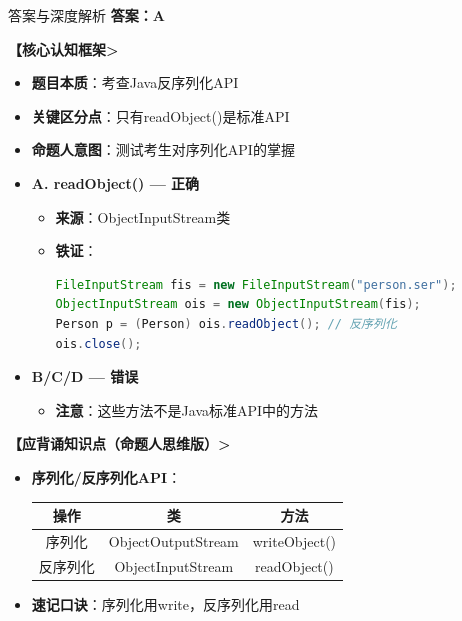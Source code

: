 \documentclass[12pt, a4paper]{ctexart}
\begin{document}
\begin{bluebox}{答案与深度解析}
	\textbf{答案：A}

	\textbf{【核心认知框架>}
	\begin{itemize}[label={}, leftmargin=*, nosep]
		\item \textbf{题目本质}：考查Java反序列化API
		\item \textbf{关键区分点}：只有readObject()是标准API
		\item \textbf{命题人意图}：测试考生对序列化API的掌握
	\end{itemize}

	\begin{itemize}[label={}, nosep]
		\item \textbf{A. readObject() — 正确}
		\begin{itemize}[label={}, leftmargin=*, nosep]
			\item \textbf{来源}：ObjectInputStream类
			\item \textbf{铁证}：
			      \begin{lstlisting}[language=Java]
FileInputStream fis = new FileInputStream("person.ser");
ObjectInputStream ois = new ObjectInputStream(fis);
Person p = (Person) ois.readObject(); // 反序列化
ois.close();
      \end{lstlisting}
		\end{itemize}

		\item \textbf{B/C/D — 错误}
		\begin{itemize}[label={}, leftmargin=*, nosep]
			\item \textbf{注意}：这些方法不是Java标准API中的方法
		\end{itemize}
	\end{itemize}

	\textbf{【应背诵知识点（命题人思维版）>}
	\begin{itemize}[label={}, nosep]
		\item \textbf{序列化/反序列化API}：
		      \begin{center}
			      \begin{tabular}{|c|c|c|}
				      \hline
				      \textbf{操作} & \textbf{类}         & \textbf{方法}   \\
				      \hline
				      序列化         & ObjectOutputStream & writeObject() \\
				      \hline
				      反序列化        & ObjectInputStream  & readObject()  \\
				      \hline
			      \end{tabular}
		      \end{center}

		\item \textbf{速记口诀}：序列化用write，反序列化用read
	\end{itemize}
\end{bluebox}
\end{document}

